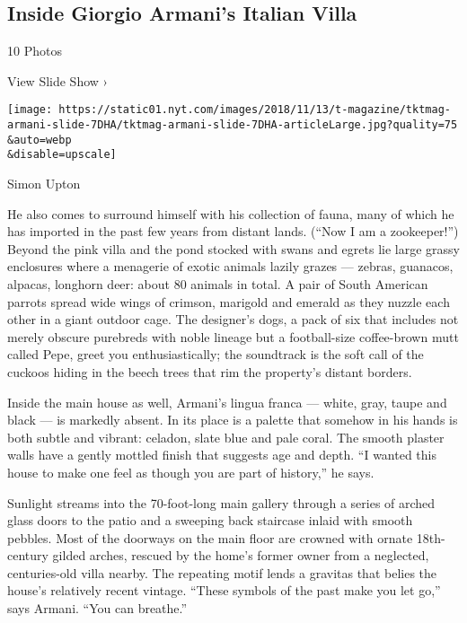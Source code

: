 \href{https://www.nytimes.com/slideshow/2018/11/19/t-magazine/inside-giorgio-armanis-italian-villa.html}{}

\hypertarget{inside-giorgio-armanis-italian-villa}{%
\subsection{Inside Giorgio Armani's Italian
Villa}\label{inside-giorgio-armanis-italian-villa}}

10 Photos

View Slide Show ›

\texttt{[image: https://static01.nyt.com/images/2018/11/13/t-magazine/tktmag-armani-slide-7DHA/tktmag-armani-slide-7DHA-articleLarge.jpg?quality=75\\\&auto=webp\\\&disable=upscale]}

Simon Upton

He also comes to surround himself with his collection of fauna, many of
which he has imported in the past few years from distant lands. (``Now I
am a zookeeper!'') Beyond the pink villa and the pond stocked with swans
and egrets lie large grassy enclosures where a menagerie of exotic
animals lazily grazes --- zebras, guanacos, alpacas, longhorn deer:
about 80 animals in total. A pair of South American parrots spread wide
wings of crimson, marigold and emerald as they nuzzle each other in a
giant outdoor cage. The designer's dogs, a pack of six that includes not
merely obscure purebreds with noble lineage but a football-size
coffee-brown mutt called Pepe, greet you enthusiastically; the
soundtrack is the soft call of the cuckoos hiding in the beech trees
that rim the property's distant borders.

Inside the main house as well, Armani's lingua franca --- white, gray,
taupe and black --- is markedly absent. In its place is a palette that
somehow in his hands is both subtle and vibrant: celadon, slate blue and
pale coral. The smooth plaster walls have a gently mottled finish that
suggests age and depth. ``I wanted this house to make one feel as though
you are part of history,'' he says.

Sunlight streams into the 70-foot-long main gallery through a series of
arched glass doors to the patio and a sweeping back staircase inlaid
with smooth pebbles. Most of the doorways on the main floor are crowned
with ornate 18th-century gilded arches, rescued by the home's former
owner from a neglected, centuries-old villa nearby. The repeating motif
lends a gravitas that belies the house's relatively recent vintage.
``These symbols of the past make you let go,'' says Armani. ``You can
breathe.''

